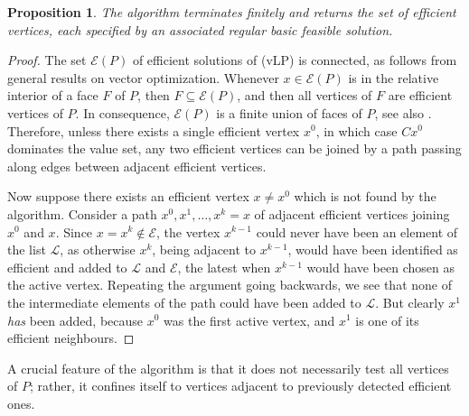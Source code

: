 \documentclass{article}
\newtheorem{proposition}[theorem]{Proposition}
\theoremstyle{definition}
\numberwithin{equation}{section}
\begin{document}
\begin{proposition}
    The algorithm terminates finitely and returns the set of efficient vertices, each specified by an associated regular basic feasible solution.
\end{proposition}

\begin{proof}
    The set $\mathscr E(P)$ of efficient solutions of (vLP) is connected, as follows from
    general results \cite[Thm. 3.1, Thm. 3.2]{20} on vector optimization. 
    Whenever $x\in \mathscr E(P)$ is in the relative interior of a face $F$ of $P$, then $F \subseteq \mathscr E(P)$, and then all vertices of $F$
    are efficient vertices of $P$.    
    In consequence,
    $\mathscr E(P)$ is a finite union of faces of $P$,
    see also \cite{6, 2}.  Therefore, unless there exists a single efficient vertex $x^0$, in which case $Cx^0$ dominates the value set, any two efficient vertices can be joined by a path
    passing along edges between adjacent efficient vertices. 
    
    Now suppose there exists an efficient vertex $x \not= x^0$ which is not found by the algorithm. 
    Consider a path $x^0,x^1,\dots,x^k=x$ of adjacent efficient vertices joining $x^0$ and $x$. Since
    $x=x^k\not\in \mathscr E$, the vertex $x^{k-1}$ could never have been an element of the list $\mathscr L$, as otherwise $x^k$, being adjacent to $x^{k-1}$, would have been
    identified as efficient and added to $\mathscr L$ and $\mathscr E$, the latest when $x^{k-1}$ would have been chosen as the active vertex. Repeating the argument going backwards,
    we see that none of the intermediate elements of the path could have been added to $\mathscr L$. 
    But clearly $x^1$ {\it has} been added, because $x^0$ was the first active vertex, and $x^1$ is one of its efficient neighbours.
    \end{proof}


A crucial feature of the algorithm is that it does not necessarily test all vertices of $P$; 
rather, it confines itself to vertices adjacent to previously detected efficient ones. 
\end{document}
